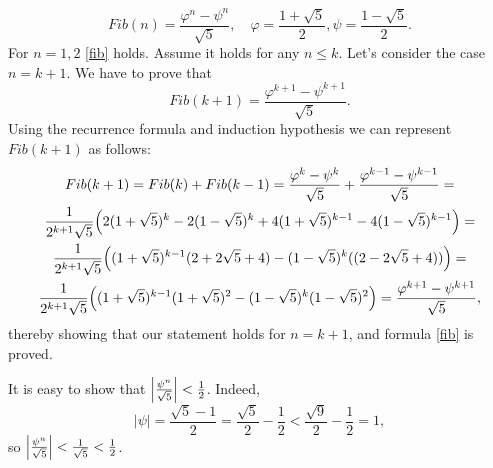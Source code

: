 \documentclass[a4paper,10pt]{article}
\begin{document}
\begin{equation}\label{fib}
  Fib(n)=\frac{\varphi^n - \psi^n}{\sqrt{5}}, \quad
  \varphi = \frac{1+\sqrt{5}}{2},
  \psi = \frac{1-\sqrt{5}}{2}.
\end{equation}
For $n=1, 2$ \eqref{fib} holds. Assume it holds for any $n \le k$. Let's consider the case $n=k+1$. We have to prove that
\begin{equation*}
  Fib(k+1)=\frac{\varphi^{k+1} - \psi^{k+1}}{\sqrt{5}}.
\end{equation*}
Using the recurrence formula and  induction hypothesis we can represent $Fib(k+1)$ as follows:
\begin{multline*}
  Fib(k+1) = Fib(k) + Fib(k-1)=
  \frac{\varphi^{k} - \psi^{k}}{\sqrt{5}} +
  \frac{\varphi^{k-1} - \psi^{k-1}}{\sqrt{5}} = \\
  \frac{1}{2^{k+1}\sqrt{5}}
  \Bigl(
  2(1+\sqrt{5})^k - 2(1-\sqrt{5})^{k} 
  +4(1+\sqrt{5})^{k-1} - 4(1-\sqrt{5})^{k-1} 
  \Bigr)=\\
  \frac{1}{2^{k+1}\sqrt{5}}
  \Bigl(
  (1+\sqrt{5})^{k-1}(2+2\sqrt{5}+4) - (1-\sqrt{5})^{k}((2-2\sqrt{5}+4))
  \Bigr)=\\
  \frac{1}{2^{k+1}\sqrt{5}}
  \Bigl(
  (1+\sqrt{5})^{k-1}(1+\sqrt{5})^2 - (1-\sqrt{5})^{k}(1-\sqrt{5})^2
  \Bigr)=\frac{\varphi^{k+1} - \psi^{k+1}}{\sqrt{5}},
\end{multline*}
thereby showing that our statement holds for $n=k+1$, and formula \eqref{fib} is proved.

It is easy to show that $\Bigl|\frac{\psi^n}{\sqrt{5}}\Bigr|<\frac{1}{2}$. Indeed,
\begin{equation*}
  |\psi| = \frac{\sqrt{5}-1}{2} = \frac{\sqrt{5}}{2} - \frac{1}{2} <
  \frac{\sqrt{9}}{2} - \frac{1}{2} = 1,
\end{equation*}
so $\Bigl|\frac{\psi^n}{\sqrt{5}}\Bigr| < \frac{1}{\sqrt{5}} < \frac{1}{2}$.
\end{document}
